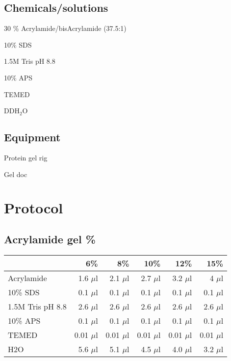 	\subsection{Chemicals/solutions}
	\begin{packed_enum}
	\item 30 \% Acrylamide/bisAcrylamide (37.5:1)
	\item 10\% SDS
	\item 1.5M Tris pH 8.8
	\item 10\% APS		
	\item	TEMED		
	\item 	DDH$_{2}$O	
	\end{packed_enum}
	
	\subsection{Equipment}
	\begin{packed_enum}
		\item Protein gel rig
		\item Gel doc
	\end{packed_enum}
 

\section{Protocol}
	\subsection{Acrylamide gel \%}
	\begin{tabular}{l r r r r r}
	{\bf   } & {\bf 6\%} & {\bf 8\%} & {\bf 10\%} & {\bf 12\%} & {\bf 15\%}\\
			\hline
	Acrylamide	&	1.6 $\mu$l	& 2.1 $\mu$l & 2.7 $\mu$l & 3.2 $\mu$l &	4 $\mu$l \\
	10\% SDS		 & 0.1 $\mu$l	 & 0.1 $\mu$l & 	0.1 $\mu$l & 	0.1 $\mu$l	 & 0.1 $\mu$l\\
	1.5M Tris pH 8.8  & 2.6 $\mu$l	 & 2.6 $\mu$l	 & 2.6 $\mu$l	 & 2.6 $\mu$l	& 2.6 $\mu$l\\
	10\% APS		 & 0.1 $\mu$l	 & 0.1 $\mu$l	 & 0.1 $\mu$l	 & 0.1 $\mu$l	 & 0.1 $\mu$l\\
	TEMED		 & 0.01 $\mu$l & 0.01 $\mu$l & 0.01 $\mu$l	 & 0.01 $\mu$l	 & 0.01 $\mu$l\\
	H2O		 & 5.6 $\mu$l	 & 5.1 $\mu$l	 & 4.5 $\mu$l	 & 4.0 $\mu$l	 & 3.2 $\mu$l\\
		\hline
	
	\end{tabular}
